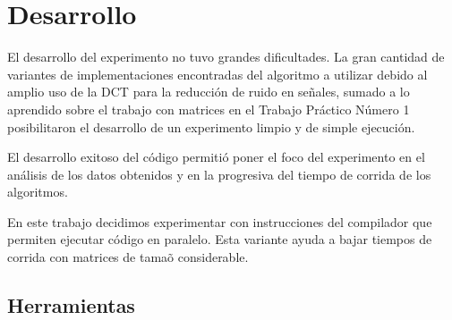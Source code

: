 
\section{Desarrollo}

El desarrollo del experimento no tuvo grandes dificultades. La gran cantidad de
variantes de implementaciones encontradas del algoritmo a utilizar debido al
amplio uso de la DCT para la reducci\'on de ruido en se\~nales, sumado a lo
aprendido sobre el trabajo con matrices en el Trabajo Pr\'actico N\'umero 1
posibilitaron el desarrollo de un experimento limpio y de simple ejecuci\'on.

El desarrollo exitoso del c\'odigo permiti\'o poner el foco del experimento en
el an\'alisis de los datos obtenidos y en la progresiva del tiempo de corrida
de los algoritmos.

En este trabajo decidimos experimentar con instrucciones del compilador que
permiten ejecutar c\'odigo en paralelo. Esta variante ayuda a bajar tiempos de
corrida con matrices de tama\~o considerable.

\subsection{Herramientas}


